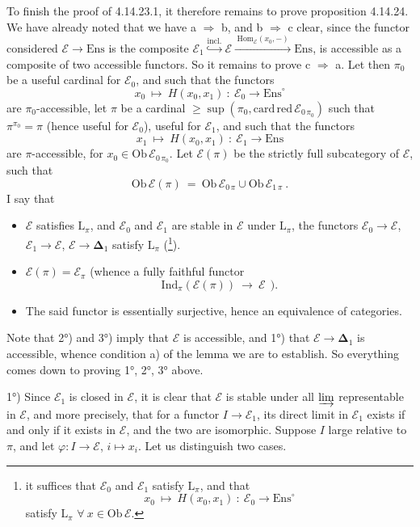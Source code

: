 \documentclass[11pt]{article}
\newcommand{\printedpage}[1]{\marginpar{\footnotesize p.~#1}}
\newcommand{\msp}[1]{\marginpar{\footnotesize [#1]}}
\newcommand{\bDelta}{\boldsymbol{\Delta}}
\newcommand{\Ens}{\mathrm{Ens}}
\newcommand{\Ob}{\mathrm{Ob}\,}
\newcommand{\Hom}{\mathrm{Hom}}
\begin{document}
To finish the proof of 4.14.23.1, it therefore remains to prove proposition 4.14.24. We have already noted that we have a $\Longrightarrow$ b, and b $\Longrightarrow$ c clear, since the functor considered $\mathcal{E}\longrightarrow\Ens$ is the composite $\mathcal{E}_1\overset{\text{incl.}}{\hookrightarrow}\mathcal{E}\xrightarrow{\;\Hom_{\mathcal{E}}(x_0,-)\;}\Ens$, is accessible as a composite of two
\msp{page 415}
accessible functors. So it remains to prove c $\Longrightarrow$ a. Let then $\pi_0$ be a useful cardinal for $\mathcal{E}_0$, and such that the functors
\[
x_0\ \longmapsto\ H(x_0,x_1)\ :\ \mathcal{E}_0\longrightarrow\Ens^{\circ}
\]
are $\pi_0$-accessible, let $\pi$ be a cardinal $\geqslant\sup(\pi_0,\mathrm{card}\,\text{red}\,\mathcal{E}_{0\,\pi_0})$ such that $\pi^{\pi_0}=\pi$ (hence useful for $\mathcal{E}_0$), useful for $\mathcal{E}_1$, and such that the functors
\[
x_1\ \longmapsto\ H(x_0,x_1)\ :\ \mathcal{E}_1\longrightarrow\Ens
\]
are $\pi$-accessible, for $x_0\in\Ob\mathcal{E}_{0\,\pi_0}$. Let $\mathcal{E}(\pi)$ be the strictly full subcategory of $\mathcal{E}$, such that
\[
\Ob\mathcal{E}(\pi)\ =\ \Ob\mathcal{E}_{0\,\pi}\cup\Ob\mathcal{E}_{1\,\pi}\ .
\]
I say that
\begin{itemize}[leftmargin=*]
\item[1°)] $\mathcal{E}$ satisfies $\mathrm{L}_\pi$, and $\mathcal{E}_0$ and $\mathcal{E}_1$ are stable in $\mathcal{E}$ under $\mathrm{L}_\pi$, the functors $\mathcal{E}_0\longrightarrow\mathcal{E}$, $\mathcal{E}_1\longrightarrow\mathcal{E}$, $\mathcal{E}\longrightarrow\bDelta_1$ satisfy $\mathrm{L}_\pi$ (\footnote[174]{it suffices that $\mathcal{E}_0$ and $\mathcal{E}_1$ satisfy $\mathrm{L}_\pi$, and that
\[
x_0\ \longmapsto\ H(x_0,x_1)\ :\ \mathcal{E}_0\longrightarrow\Ens^{\circ}
\]
satisfy $\mathrm{L}_\pi$ $\forall\ x\in\Ob\mathcal{E}$.}).
\item[2°)] $\mathcal{E}(\pi)=\mathcal{E}_\pi$ (whence a fully faithful functor
\[
\mathrm{Ind}_\pi(\mathcal{E}(\pi))\ \longrightarrow\ \mathcal{E}\ \ ).
\]
\item[3°)] The said functor is essentially surjective,
\msp{page 416}
hence an equivalence of categories.
\end{itemize}
Note that 2°) and 3°) imply that $\mathcal{E}$ is accessible, and 1°) that $\mathcal{E}\longrightarrow\bDelta_1$ is accessible, whence condition a) of the lemma we are to establish. So everything comes down to proving 1°, 2°, 3° above.

\printedpage{158}
1°) Since $\mathcal{E}_1$ is closed in $\mathcal{E}$, it is clear that $\mathcal{E}$ is stable under all $\varinjlim$ representable in $\mathcal{E}$, and more precisely, that for a functor $I\longrightarrow\mathcal{E}_1$, its direct limit in $\mathcal{E}_1$ exists if and only if it exists in $\mathcal{E}$, and the two are isomorphic. Suppose $I$ large relative to $\pi$, and let $\varphi:I\longrightarrow\mathcal{E}$, $i\longmapsto x_i$. Let us distinguish two cases.
\end{document}
